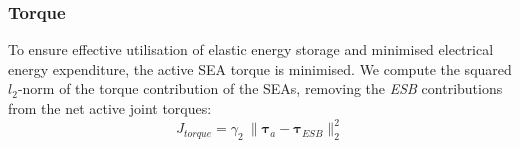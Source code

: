 \documentclass[letterpaper, 10 pt, conference]{ieeeconf}  %
\begin{document}

\subsubsection{Torque}
To ensure effective utilisation of elastic energy storage and minimised electrical energy expenditure, the active SEA torque is minimised. We compute the squared $l_2$-norm of the torque contribution of the SEAs, removing the \textit{ESB} contributions from the net active joint torques:
\begin{equation}
	J_{torque}= \gamma_2 \: \| \boldsymbol{\tau}_a - \boldsymbol{\tau}_{ESB} \|_2^2
\end{equation}
\end{document}
